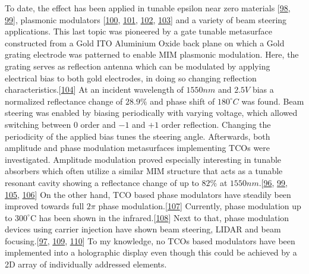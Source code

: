 \documentclass[a4paper,10pt,english,openany,oneside]{jupyterBook}
\begin{document}
\sphinxAtStartPar
To date, the effect has been applied in tunable epsilon near zero materials {[}\hyperlink{cite.bib:id468}{98}, \hyperlink{cite.bib:id158}{99}{]}, plasmonic modulators {[}\hyperlink{cite.bib:id349}{100}, \hyperlink{cite.bib:id354}{101}, \hyperlink{cite.bib:id162}{102}, \hyperlink{cite.bib:id304}{103}{]} and a variety of beam steering applications. This last topic was pioneered by a gate tunable metasurface constructed from a Gold \sphinxhyphen{} ITO \sphinxhyphen{} Aluminium Oxide back plane on which a Gold grating electrode was patterned to enable MIM plasmonic modulation. Here, the grating serves as reflection antenna which can be modulated by applying electrical bias to both gold electrodes, in doing so changing reflection characteristics.{[}\hyperlink{cite.bib:id193}{104}{]} At an incident wavelength of \(1550nm\) and \(2.5V\) bias a normalized reflectance change of \(28.9\%\) and phase shift of \(180^{\circ}C\) was found. Beam steering was enabled by biasing periodically with varying voltage, which allowed switching between \(0\) order and \(-1\) and \(+1\) order reflection. Changing the periodicity of the applied bias tunes the steering angle. Afterwards, both amplitude and phase modulation metasurfaces implementing TCOs were investigated. Amplitude modulation proved especially interesting in tunable absorbers which often utilize a similar MIM structure that acts as a tunable resonant cavity showing a reflectance change of up to \(82\%\) at \(1550nm\).{[}\hyperlink{cite.bib:id71}{96}, \hyperlink{cite.bib:id158}{99}, \hyperlink{cite.bib:id197}{105}, \hyperlink{cite.bib:id196}{106}{]} On the other hand, TCO based phase modulators have steadily been improved towards full \(2\pi\) phase modulation.{[}\hyperlink{cite.bib:id147}{107}{]} Currently, phase modulation up to \(300^{\circ}\)C has been shown in the infrared.{[}\hyperlink{cite.bib:id145}{108}{]} Next to that, phase modulation devices using carrier injection have shown beam steering, LIDAR and beam focusing.{[}\hyperlink{cite.bib:id84}{97}, \hyperlink{cite.bib:id465}{109}, \hyperlink{cite.bib:id166}{110}{]}
To my knowledge, no TCOs based modulators have been implemented into a holographic display even though this could be achieved by a 2D array of individually addressed elements.
\end{document}
